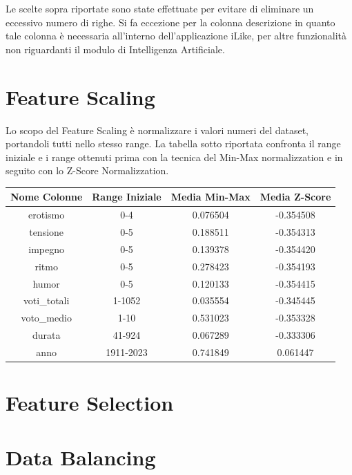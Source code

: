 \documentclass[a4paper, 10pt]{report}
\begin{document}
            Le scelte sopra riportate sono state effettuate per evitare di eliminare un eccessivo numero di righe.
            Si fa eccezione per la colonna descrizione in quanto tale colonna è necessaria all'interno dell'applicazione
            iLike, per altre funzionalità non riguardanti il modulo di Intelligenza Artificiale.

        \section{Feature Scaling}\label{sec:feature-scaling}
            Lo scopo del Feature Scaling è normalizzare i valori numeri del dataset, portandoli tutti nello stesso range.
            La tabella sotto riportata confronta il range iniziale e i range ottenuti prima con la tecnica del Min-Max normalizzation
            e in seguito con lo Z-Score Normalizzation.

            \begin{tabular}{ |c|c|c|c| }
                \hline \rowcolor{Goldenrod} Nome Colonne & Range Iniziale & Media Min-Max & Media Z-Score \\
                \hline erotismo & 0-4 & 0.076504 &  -0.354508 \\
                \hline tensione & 0-5 & 0.188511 & -0.354313 \\
                \hline impegno & 0-5 & 0.139378 & -0.354420 \\
                \hline ritmo & 0-5 & 0.278423 & -0.354193 \\
                \hline humor & 0-5 & 0.120133 & -0.354415 \\
                \hline voti\_totali & 1-1052 & 0.035554 & -0.345445 \\
                \hline voto\_medio & 1-10 & 0.531023 & -0.353328 \\
                \hline durata & 41-924 & 0.067289 & -0.333306 \\
                \hline anno & 1911-2023 & 0.741849 & 0.061447 \\
                \hline
            \end{tabular}

        \section{Feature Selection}\label{sec:feature-selection}


        \section{Data Balancing}\label{sec:data-balancing}
\end{document}
